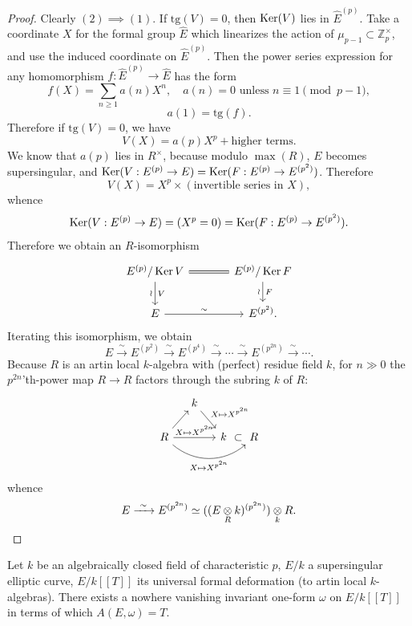 \begin{proof}
Clearly $(2) \implies (1)$. If $\mathrm{tg}(V) = 0$, then $\operatorname{Ker}(V)$ lies in $\widehat{E}^{(p)}$. Take a coordinate $X$ for the formal group $\widehat{E}$ which linearizes the action of $\mu_{p-1} \subset \mathbb{Z}_p^\times$, and use the induced coordinate on $\widehat{E}^{(p)}$. Then the power series expression for any homomorphism $f : \widehat{E}^{(p)} \to \widehat{E}$ has the form
\[
f(X) = \sum_{n \ge 1} a(n) X^n, \quad a(n) = 0 \text{ unless } n \equiv 1 \pmod{p-1},
\]
\[
a(1) = \mathrm{tg}(f) .
\]
Therefore if $\mathrm{tg}(V) = 0$, we have
\[
V(X) = a(p) X^p + \text{higher terms} .
\]
We know that $a(p)$ lies in $R^\times$, because modulo $\max(R)$, $E$ becomes supersingular, and $\operatorname{Ker}(V : E^{(p)} \to E) = \operatorname{Ker}(F : E^{(p)} \to E^{(p^2)})$. Therefore
\[
V(X) = X^p \times (\text{invertible series in } X) ,
\]
whence
\[
\operatorname{Ker}(V : E^{(p)} \to E) = (X^p = 0) = \operatorname{Ker}(F : E^{(p)} \to E^{(p^2)}) .
\]
Therefore we obtain an $R$-isomorphism
\[
\begin{tikzcd}[row sep=1.8em, column sep=large]
E^{(p)}/\Ker V \arrow[d, "\wr"', "V"] \arrow[r, equal] & E^{(p)}/\Ker F \arrow[d, "\wr"', "F"] \\
E \arrow[r, "\sim"] & E^{(p^2)} .
\end{tikzcd}
\]
Iterating this isomorphism, we obtain
\[
E \xrightarrow{\ \sim\ } E^{(p^2)} \xrightarrow{\ \sim\ } E^{(p^4)} \xrightarrow{\ \sim\ } \cdots \xrightarrow{\ \sim\ } E^{(p^{2n})} \xrightarrow{\ \sim\ } \cdots .
\]
Because $R$ is an artin local $k$-algebra with (perfect) residue field $k$, for $n \gg 0$ the $p^{2n}$'th-power map $R \to R$ factors through the subring $k$ of $R$:
\[
\begin{tikzcd}[row sep=1.6em, column sep=small]
& k \arrow[dr, "X \mapsto X^{p^{2n}}"] & & \\
R \arrow[ur] \arrow[rr, "X \mapsto X^{p^{2n}}"] \arrow[rrr, bend right=40, "X \mapsto X^{p^{2n}}"'] & & k \arrow[r, phantom, "\subset"] & R
\end{tikzcd}
\]
whence
\[
E \xrightarrow{\ \sim\ } E^{(p^{2n})} \simeq ((E \underset{R}{\otimes} k)^{(p^{2n})}) \underset{k}{\otimes} R . \qedhere
\]
\end{proof}

\begin{kcor}\label{cor:12.4.4}
Let $k$ be an algebraically closed field of characteristic $p$, $E/k$ a supersingular elliptic curve, $E/k[[T]]$ its universal formal deformation (to artin local $k$-algebras). There exists a nowhere vanishing invariant one-form $\omega$ on $E/k[[T]]$ in terms of which $A(E,\omega) = T$.
\end{kcor}

